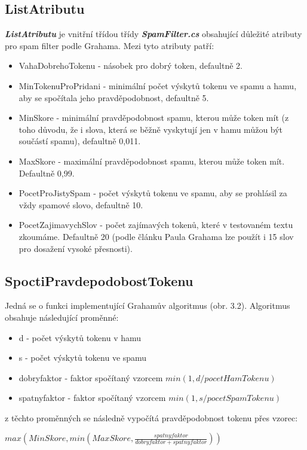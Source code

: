 \documentclass{semestralka}
\begin{document}
\subsection{ListAtributu}
\textbf{\textit{ListAtributu}} je vnitřní třídou třídy \textbf{\textit{SpamFilter.cs}} obsahující důležité atributy pro spam filter podle Grahama. Mezi tyto atributy patří:
\begin{itemize}
\item
VahaDobrehoTokenu - násobek pro dobrý token, defaultně 2.
\item
MinTokenuProPridani - minimální počet výskytů tokenu ve spamu a hamu, aby se spočítala jeho pravděpodobnost, defaultně 5.
\item
MinSkore - minimální pravděpodobnost spamu, kterou může token mít (z toho důvodu, že i slova, která se běžně vyskytují jen v hamu můžou být součástí spamu), defaultně 0,011.
\item
MaxSkore - maximální pravděpodobnost spamu, kterou může token mít. Defaultně 0,99.
\item
PocetProJistySpam - počet výskytů tokenu ve spamu, aby se prohlásil za vždy spamové slovo, defaultně 10.
\item
PocetZajimavychSlov - počet zajímavých tokenů, které v testovaném textu zkoumáme. Defaultně 20 (podle článku Paula Grahama lze použít i 15 slov pro dosažení vysoké přesnosti).
\end{itemize}

\subsection{SpoctiPravdepodobostTokenu}
Jedná se o funkci implementující Grahamův algoritmus (obr. 3.2). Algoritmus obsahuje následující proměnné:

\begin{itemize}
\item
d - počet výskytů tokenu v hamu
\item
s - počet výskytů tokenu ve spamu
\item
dobryfaktor - faktor spočítaný vzorcem $min(1, d / pocetHamTokenu)$
\item
spatnyfaktor - faktor spočítaný vzorcem $min(1, s / pocetSpamTokenu)$
\end{itemize}

z těchto proměnných se následně vypočítá pravděpodobnost tokenu přes vzorec:

\begin{center}
$max(MinSkore, min(MaxSkore, \frac{spatnyfaktor}{dobryfaktor + spatnyfaktor}))$
\end{center}
\end{document}
